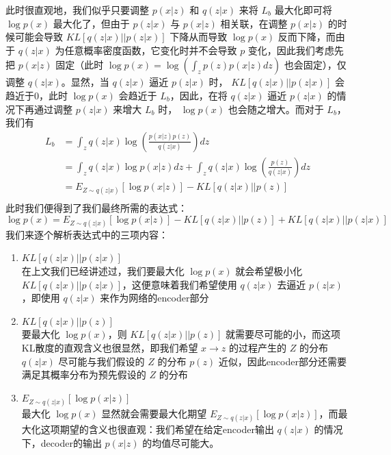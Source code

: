 \documentclass[12pt,a4paper,UTF8]{article}
\begin{document}
此时很直观地，我们似乎只要调整 $p\left(x|z\right)$ 和 $q\left(z|x\right)$ 来将 $L_b$ 最大化即可将 $\log p\left(x\right)$ 最大化了，但由于 $p\left(z|x\right)$ 与 $p\left(x|z\right)$ 相关联，在调整 $p\left(x|z\right)$ 的时候可能会导致 $KL\left[q\left(z|x\right)||p\left(z|x\right)\right]$ 下降从而导致 $\log p\left(x\right)$ 反而下降，而由于 $q\left(z|x\right)$ 为任意概率密度函数，它变化时并不会导致 $p$ 变化，因此我们考虑先把 $p\left(x|z\right)$ 固定（此时 $\log p\left(x\right)=\log\left(\int_zp\left(z\right)p\left(x|z\right)dz\right)$ 也会固定），仅调整 $q\left(z|x\right)$。显然，当 $q\left(z|x\right)$ 逼近 $p\left(z|x\right)$ 时， $KL\left[q\left(z|x\right)||p\left(z|x\right)\right]$ 会趋近于0，此时 $\log p\left(x\right)$ 会趋近于 $L_b$，因此，在将 $q\left(z|x\right)$ 逼近 $p\left(z|x\right)$ 的情况下再通过调整 $p\left(z|x\right)$ 来增大 $L_b$ 时， $\log p\left(x\right)$ 也会随之增大。而对于 $L_b$，我们有
\[\begin{aligned}
L_b&=\int_zq\left(z|x\right)\log\left(\frac{p\left(x|z\right)p\left(z\right)}{q\left(z|x\right)}\right)dz\\
&=\int_zq\left(z|x\right)\log p\left(x|z\right)dz+\int_zq\left(z|x\right)\log\left(\frac{p\left(z\right)}{q\left(z|x\right)}\right)dz\\
&=E_{Z\sim q\left(z|x\right)}\left[\log p\left(x|z\right)\right]-KL\left[q\left(z|x\right)||p\left(z\right)\right]\\
\end{aligned}\]
此时我们便得到了我们最终所需的表达式：
\[\log p\left(x\right)=E_{Z\sim q\left(z|x\right)}\left[\log p\left(x|z\right)\right]-KL\left[q\left(z|x\right)||p\left(z\right)\right]+KL\left[q\left(z|x\right)||p\left(z|x\right)\right]\]
我们来逐个解析表达式中的三项内容：

\begin{enumerate}
\item $KL\left[q\left(z|x\right)||p\left(z|x\right)\right]$\\
在上文我们已经讲述过，我们要最大化 $\log p\left(x\right)$ 就会希望极小化 $KL\left[q\left(z|x\right)||p\left(z|x\right)\right]$，这便意味着我们希望使用 $q\left(z|x\right)$ 去逼近 $p\left(z|x\right)$，即使用 $q\left(z|x\right)$ 来作为网络的encoder部分
\item $KL\left[q\left(z|x\right)||p\left(z\right)\right]$\\
要最大化 $\log p\left(x\right)$，则 $KL\left[q\left(z|x\right)||p\left(z\right)\right]$ 就需要尽可能的小，而这项KL散度的直观含义也很显然，即我们希望 $x\to z$ 的过程产生的 $Z$ 的分布 $q\left(z|x\right)$ 尽可能与我们假设的 $Z$ 的分布 $p\left(z\right)$ 近似，因此encoder部分还需要满足其概率分布为预先假设的 $Z$ 的分布
\item $E_{Z\sim q\left(z|x\right)}\left[\log p\left(x|z\right)\right]$\\
最大化 $\log p\left(x\right)$ 显然就会需要最大化期望 $E_{Z\sim q\left(z|x\right)}\left[\log p\left(x|z\right)\right]$，而最大化这项期望的含义也很直观：我们希望在给定encoder输出 $q\left(z|x\right)$ 的情况下，decoder的输出 $p\left(x|z\right)$ 的均值尽可能大。
\end{enumerate}
\end{document}
